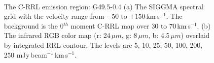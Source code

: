 \documentclass[manuscript]{aastex61}
\newcommand{\kms}{\,km\,s$^{-1}$}
\newcommand{\um}{\mu m}
\begin{document}
\begin{figure}[H]
	\centering
	\\
	\caption{The C-RRL emission region: G49.5-0.4
	(a) The SIGGMA spectral grid with the velocity range from $-50$ to $+150$\kms.
	The background is the 0$^{th}$ moment C-RRL map over $30$ to $70$\kms.
	(b) The infrared RGB color map (r: 24\,$\um$, g: 8\,$\um$, b: 4.5\,$\um$) overlaid by integrated RRL contour.
	The levels are 5, 10, 25, 50, 100, 200, 250 mJy\,beam$^{-1}$\kms.}
	\label{fig_crrl-g494}
\end{figure}
\end{document}
